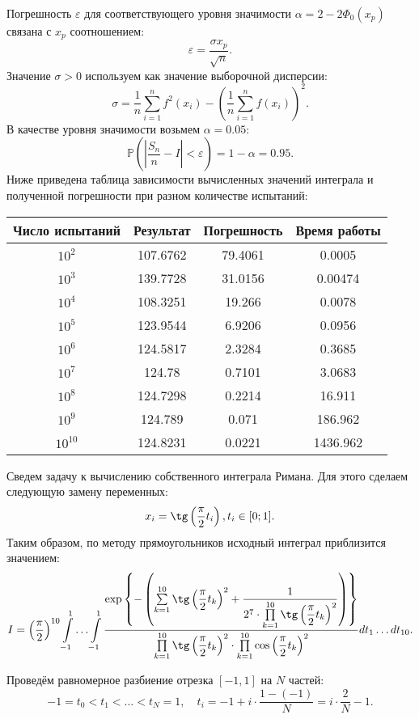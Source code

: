 Погрешность $ \varepsilon $ для соответствующего уровня значимости $ \alpha = 2 - 
 2\Phi_0(x_p)$ связана с $ x_p $ соотношением:
$$
\varepsilon = \dfrac{\sigma x_p}{\sqrt{n}}.
$$
Значение $ \sigma > 0 $ используем как значение выборочной дисперсии:
$$
\sigma = \frac{1}{n} \sum_{i = 1}^n f^2(x_i) - \left( \frac{1}{n}
 \sum_{i = 1}^n f(x_i) \right)^2.
$$
В качестве уровня значимости возьмем $ \alpha = 0.05 $:
$$
\mathbb{P} \left( \left| \dfrac{S_n}{n} - I \right| < \varepsilon \right) =
 1 - \alpha = 0.95.
$$
Ниже приведена таблица зависимости вычисленных значений интеграла и полученной
 погрешности при разном количестве испытаний:
\begin{center}
	\begin{tabular}{|c|c|c|c|}
		\hline
		Число испытаний & Результат & Погрешность&Время работы\\\hline
		$10^2$&107.6762&79.4061&0.0005\\\hline
		$10^3$&139.7728&31.0156&0.00474\\\hline
		$10^4$&108.3251&19.266&0.0078\\\hline
		$10^5$&123.9544&6.9206&0.0956\\\hline
		$10^6$&124.5817&2.3284&0.3685 \\\hline
		$10^7$&124.78&0.7101& 3.0683\\\hline
		$10^8$&124.7298&0.2214&16.911\\\hline
		$10^9$&124.789&0.071& 186.962\\\hline
		$10^10$&124.8231&0.0221& 1436.962\\\hline
	\end{tabular}
\end{center}

Сведем задачу к вычислению собственного интеграла Римана. Для этого сделаем
 следующую замену переменных:
$$
x_i = \tg \left( \frac{\pi}{2} t_i \right), t_i \in [0; 1].
$$
Таким образом, по методу прямоугольников исходный интеграл приблизится значением:
$$
I = \left( \dfrac{\pi}{2} \right)^{10} \int\limits_{-1}^{1} \ldots
 \int\limits_{-1}^{1} \dfrac{\exp \left\lbrace - \left( \sum\limits_{k = 1}^{10}
 \tg \left( \dfrac{\pi}{2} t_k \right)^2 + \dfrac{1}{2^7 \cdot
 \prod\limits_{k = 1}^{10} \tg \left( \dfrac{\pi}{2} t_k \right)^2} \right)
 \right\rbrace}{\prod\limits_{k = 1}^{10} \tg \left( \dfrac{\pi}{2} t_k \right)^2
 \cdot\prod\limits_{k = 1}^{10} \cos \left( \dfrac{\pi}{2} t_k \right)^2} dt_1 
 \ldots dt_{10}.
$$

Проведём равномерное разбиение отрезка \( [-1,1] \) на \( N \) частей:
\[
-1 = t_0 < t_1 < \ldots < t_N = 1,\quad t_i = -1 + i \cdot \dfrac{1-(-1)}{N} =
 i \cdot \dfrac{2}{N} - 1.
\]

